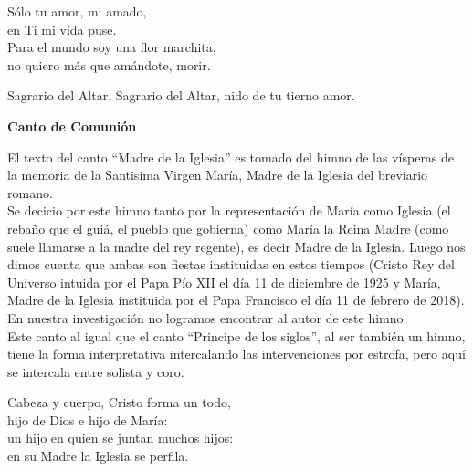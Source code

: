 \documentclass[12pt, letterpaper]{report}
\begin{document}
    \noindent
    S\'olo tu amor, mi amado,\\
    en Ti mi vida puse.\\
    Para el mundo soy una flor marchita,\\
    no quiero m\'as que am\'andote, morir.

    \noindent
    Sagrario del Altar, Sagrario del Altar, nido de tu tierno amor.
    \clearpage




    \begin{center}
      \LARGE \textbf{Canto de Comuni\'on}
    \end{center}

    \Large El texto del canto ``Madre de la Iglesia'' es tomado del himno de las v\'isperas de la memoria de la Santisima Virgen Mar\'ia, Madre de la Iglesia del breviario romano.\\
    Se decicio por este himno tanto por la representaci\'on de Mar\'ia como Iglesia
    (el reba\~no que el gui\'a, el pueblo que gobierna) como Mar\'ia la Reina Madre (como suele llamarse a la madre del rey regente), es decir Madre de la Iglesia. Luego nos dimos cuenta que ambas son fiestas instituidas en estos tiempos (Cristo Rey del Universo intuida por el Papa P\'io XII el d\'ia 11 de diciembre de 1925 y Mar\'ia, Madre de la Iglesia instituida por el Papa Francisco el d\'ia 11 de febrero de 2018). En nuestra investigaci\'on no logramos encontrar al autor de este himno.\\
    Este canto al igual que el canto ``Principe de los siglos'', al ser tambi\'en un himno, tiene la forma interpretativa intercalando las intervenciones por estrofa, pero aqu\'i se intercala entre solista y coro.

    \noindent
    \LARGE Cabeza y cuerpo, Cristo forma un todo,\\
    hijo de Dios e hijo de Mar\'ia:\\
    un hijo en quien se juntan muchos hijos:\\
    en su Madre la Iglesia se perfila.
\end{document}
